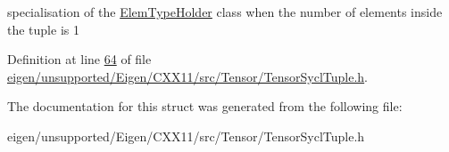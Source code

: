 specialisation of the \hyperlink{structutility_1_1tuple_1_1_elem_type_holder}{Elem\+Type\+Holder} class when the number of elements inside the tuple is 1 

Definition at line \hyperlink{eigen_2unsupported_2_eigen_2_c_x_x11_2src_2_tensor_2_tensor_sycl_tuple_8h_source_l00064}{64} of file \hyperlink{eigen_2unsupported_2_eigen_2_c_x_x11_2src_2_tensor_2_tensor_sycl_tuple_8h_source}{eigen/unsupported/\+Eigen/\+C\+X\+X11/src/\+Tensor/\+Tensor\+Sycl\+Tuple.\+h}.



The documentation for this struct was generated from the following file\+:\begin{DoxyCompactItemize}
\item 
eigen/unsupported/\+Eigen/\+C\+X\+X11/src/\+Tensor/\+Tensor\+Sycl\+Tuple.\+h\end{DoxyCompactItemize}
